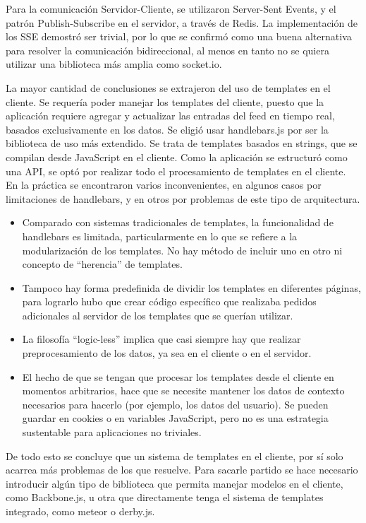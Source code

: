 \documentclass[doc,helv,longtable]{article}
\begin{document}
Para la comunicación Servidor-Cliente, se utilizaron Server-Sent Events, y el patrón Publish-Subscribe\cite{pubsub} en el servidor, a través de Redis\cite{redis}. La implementación de los SSE demostró ser trivial, por lo que se confirmó como una buena alternativa para resolver la comunicación bidireccional, al menos en tanto no se quiera utilizar una biblioteca más amplia como socket.io.

La mayor cantidad de conclusiones se extrajeron del uso de templates en el cliente. Se requería poder manejar los templates del cliente, puesto que la aplicación requiere agregar y actualizar las entradas del feed en tiempo real, basados exclusivamente en los datos. Se eligió usar handlebars.js\cite{handlebars} por ser la biblioteca de uso más extendido. Se trata de templates basados en strings, que se compilan desde JavaScript en el cliente. Como la aplicación se estructuró como una API, se optó por realizar todo el procesamiento de templates en el cliente. En la práctica se encontraron varios inconvenientes, en algunos casos por limitaciones de handlebars, y en otros por problemas de este tipo de arquitectura.
\begin{itemize}
\item  Comparado con sistemas tradicionales de templates, la funcionalidad de handlebars es limitada, particularmente en lo que se refiere a la modularización de los templates. No hay método de incluir uno en otro ni concepto de “herencia” de templates. 
\item  Tampoco hay forma predefinida de dividir los templates en diferentes páginas, para lograrlo hubo que crear código específico que realizaba pedidos adicionales al servidor de los templates que se querían utilizar.
\item  La filosofía “logic-less” implica que casi siempre hay que realizar preprocesamiento de los datos, ya sea en el cliente o en el servidor.
\item  El hecho de que se tengan que procesar los templates desde el cliente en momentos arbitrarios, hace que se necesite mantener los datos de contexto necesarios para hacerlo (por ejemplo, los datos del usuario). Se pueden guardar en cookies o en variables JavaScript, pero no es una estrategia sustentable para aplicaciones no triviales.

\end{itemize}


De todo esto se concluye que un sistema de templates en el cliente, por sí solo acarrea más problemas de los que resuelve. Para sacarle partido se hace necesario introducir algún tipo de biblioteca que permita manejar modelos en el cliente, como Backbone.js, u otra que directamente tenga el sistema de templates integrado, como meteor o derby.js.
\end{document}
